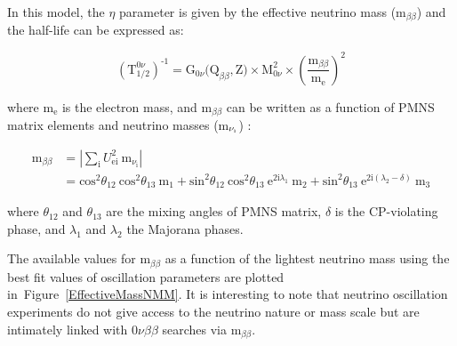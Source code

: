 \documentclass[main.tex]{subfiles}
\begin{document}
\NI In this model, the $\eta$ parameter is given by the effective neutrino mass (m$_{\beta\beta}$) and the half-life can be expressed as: 


\begin{equation}\label{eq:HalfLife0nuParam}
(\text{T}_{\text{1/2}}^{\text{0}\nu})^{\text{-1}} = \text{G}_{\text{0}\nu}\text{(Q}_{\beta\beta},\text{Z)} \times \text{M}^\text{2}_{\text{0}\nu} \times \left( \frac{\text{m}_{\beta\beta}}{\text{m}_\text{e}} \right)^\text{2}
\end{equation}


\bigskip


\NI where m$_\text{e}$ is the electron mass, and m$_{\beta\beta}$ can be written as a function of PMNS matrix elements and neutrino masses (m$_{\nu_\text{\i}}$) : 


\begin{equation}
\begin{split}
\text{m}_{\beta\beta} & = |\sum_\text{i}U_{\text{ei}}^\text{2}~\text{m}_{\nu_\text{i}} | \\
 & = \text{cos}^\text{2}\theta_{\text{12}}~\text{cos}^\text{2}\theta_{\text{13}}~\text{m}_\text{1} + \text{sin}^\text{2}\theta_{\text{12}}~\text{cos}^\text{2}\theta_{\text{13}}~\text{e}^{\text{2i}\lambda_\text{1}} ~\text{m}_\text{2} + \text{sin}^\text{2}\theta_{\text{13}}~\text{e}^{\text{2i}(\lambda_\text{2}-\delta)}~\text{m}_\text{3}
\end{split}
\end{equation}


\bigskip


\NI where $\theta_{\text{12}}$ and $\theta_{\text{13}}$ are the mixing angles of PMNS matrix, $\delta$ is the CP-violating phase, and $\lambda_\text{1}$ and $\lambda_\text{2}$ the Majorana phases.  


\bigskip


\NI The available values for m$_{\beta\beta}$ as a function of the lightest neutrino mass using the best fit values of oscillation parameters are plotted in~Figure~\ref{EffectiveMassNMM}. It is interesting to note that neutrino oscillation experiments do not give access to the neutrino nature or mass scale but are intimately linked with 0$\nu\beta\beta$ searches via m$_{\beta\beta}$. 
\end{document}
